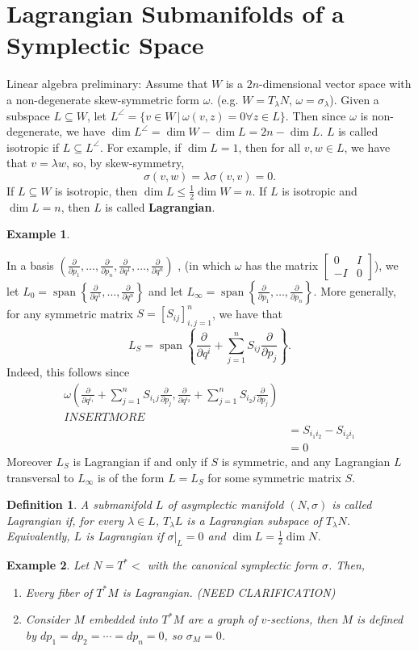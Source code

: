 \documentclass{article}
\newcommand{\nl}{\newline\newline\noindent}
\newcommand{\w}{\omega}
\newcommand{\pd}[1]{\frac{\partial}{\partial #1}}
\DeclareMathOperator{\spn}{span}
\newtheorem{ex}{Example}
\newtheorem{defn}{Definition}
\begin{document}
\section{Lagrangian Submanifolds of a Symplectic Space}
Linear algebra preliminary:
\nl
Assume that $W$ is a $2n$-dimensional vector space with a non-degenerate skew-symmetric form $\w$. (e.g. $W=T_\lambda N$, $\w = \sigma_\lambda$). Given a subspace $L\subseteq W$, let $L^\angle = \{v\in W\,|\,\w(v,z) = 0\forall z\in L\}$. Then since $\w$ is non-degenerate, we have $\dim L^\angle = \dim W - \dim L = 2n - \dim L$. $L$ is called isotropic if $L\subseteq L^\angle$. For example, if $\dim L = 1$, then for all $v,w\in L$, we have that $v=\lambda w$, so, by skew-symmetry,
\[\sigma(v,w) = \lambda \sigma(v,v) = 0.\]
If $L\subseteq W$ is isotropic, then $\dim L\leq \frac{1}{2}\dim W = n$. If $L$ is isotropic and $\dim L = n$, then $L$ is called \textbf{Lagrangian}.
\begin{ex}
    
\end{ex}
In a basis $\left(\pd{p_1},\dots,\pd{p_n},\pd{q^1},\dots,\pd{q^n}\right)$ ,  (in which $\w$ has the matrix $\begin{bmatrix}0 & I \\ -I & 0\end{bmatrix}$), we let $L_0 = \spn\left\{\pd{q^1},\dots,\pd{q^n}\right\}$ and let $L_\infty =
\spn\left\{\pd{p_1},\dots,\pd{p_n}\right\}$. More generally, for any symmetric matrix $S = [S_{ij}]_{i,j=1}^n$, we have that
\[L_S = \spn\left\{\pd{q^i} + \sum_{j=1}^n S_{ij}\pd{p_j}\right\}.\]
Indeed, this follows since
\begin{align*}
    \w\left(\pd{q^{i_1}} + \sum_{j=1}^n S_{i_1j}\pd{p_j},\pd{q^{i_2}} + \sum_{j=1}^n S_{i_2j}\pd{p_j}\right)\\
    INSERT MORE\\
    &=S_{i_1i_2} - S_{i_2i_1}\\
    &=0
\end{align*}
Moreover $L_S$ is Lagrangian if and only if $S$ is symmetric, and any Lagrangian $L$ transversal to $L_\infty$ is of the form $L=L_S$ for some symmetric matrix $S$.
\begin{defn}
    A submanifold $L$ of asymplectic manifold $(N,\sigma)$
 is called Lagrangian if, for every $\lambda\in L$, $T_\lambda L$ is a Lagrangian subspace of $T_\lambda N$. Equivalently, $L$ is Lagrangian if $\sigma|_L = 0$ and $\dim L = \frac{1}{2}\dim N$.
\end{defn}
\begin{ex}
    Let $N=T^*<$ with the canonical symplectic form $\sigma$. Then,
    \begin{enumerate}
        \item Every fiber of $T^*M$ is Lagrangian. (NEED CLARIFICATION)\\
        \item Consider $M$ embedded into $T^*M$ are a graph of $v$-sections, then $M$ is defined by $dp_1 = dp_2 = \cdots = dp_n = 0$, so $\sigma_M = 0$.
    \end{enumerate}
\end{ex}
\end{document}
